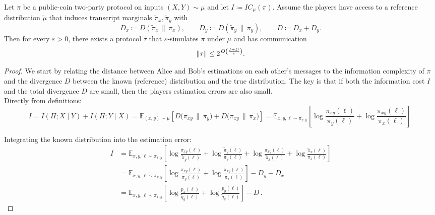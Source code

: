 \documentclass[11pt]{article}
\begin{document}
\begin{theorem}
Let $\pi$ be a public-coin two-party protocol on inputs $(X,Y) \sim \mu$ and let $I \coloneqq IC_{\mu}(\pi)$. Assume the players have access to a reference distribution $\tilde{\mu}$ that induces transcript marginals $\tilde{\pi}_x, \tilde{\pi}_y$ with
\[
  D_x \coloneqq D(\tilde{\pi}_x \,\|\, \pi_x),\qquad
  D_y \coloneqq D(\tilde{\pi}_y \,\|\, \pi_y),\qquad
  D \coloneqq D_x + D_y.
\]
Then for every $\varepsilon > 0$, there exists a protocol $\tau$ that $\varepsilon$-simulates $\pi$ under $\mu$ and has communication
\[
  \left\lVert \tau \right\rVert \le 2^{\,O\left(\frac{I + D}{\varepsilon}\right)}.
\]
\end{theorem}

\begin{proof}
We start by relating the distance between Alice and Bob's estimations on each other's messages to the information complexity of $\pi$ and the divergence $D$ between the known (reference) distribution and the true distribution. The key is that if both the information cost $I$ and the total divergence $D$ are small, then the players estimation errors are also small. \\

Directly from definitions:
\[
I = I(\Pi; X \mid Y) + I(\Pi; Y \mid X) = \mathbb{E}_{(x,y)\sim\mu} \left[ D\big( \pi_{xy} \,\|\, \pi_y \big) + D\big( \pi_{xy} \,\|\, \pi_x \big) \right] = \mathbb{E}_{x,y,\ell \sim \pi_{x,y}} \left[ \log \frac{\pi_{xy}(\ell)}{\pi_y(\ell)} + \log \frac{\pi_{xy}(\ell)}{\pi_x(\ell)} \right].
\]

Integrating the known distribution into the estimation error:
\begin{align*}
    I
    &= \mathbb{E}_{x,y,\ell \sim \pi_{x,y}} 
       \left[
          \log \frac{\pi_{xy}(\ell)}{\tilde{\pi}_y(\ell)}
          + \log \frac{\tilde{\pi}_y(\ell)}{\pi_y(\ell)}
          + \log \frac{\pi_{xy}(\ell)}{\tilde{\pi}_x(\ell)}
          + \log \frac{\tilde{\pi}_x(\ell)}{\pi_x(\ell)}
       \right] \\
    &= \mathbb{E}_{x,y,\ell \sim \pi_{x,y}} 
       \left[
          \log \frac{\pi_{xy}(\ell)}{\tilde{\pi}_y(\ell)}
          + \log \frac{\pi_{xy}(\ell)}{\tilde{\pi}_x(\ell)}
       \right]
          - D_y
          - D_x \\
    &= \mathbb{E}_{x,y,\ell \sim \pi_{x,y}} 
       \left[
          \log \frac{p_x(\ell)}{\tilde{q}_y(\ell)}
          + \log \frac{p_y(\ell)}{\tilde{q}_x(\ell)}
       \right]
       - D \,.
\end{align*}


\end{proof}
\end{document}
